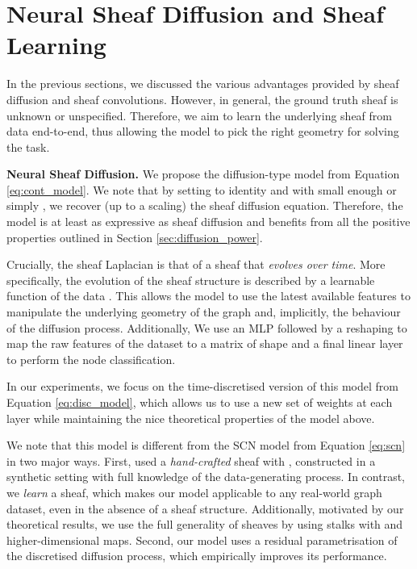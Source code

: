\documentclass{article}
\begin{document}
\section{Neural Sheaf Diffusion and Sheaf Learning}\label{sec:sheaf_learning}

In the previous sections, we discussed the various advantages provided by sheaf diffusion and sheaf convolutions. However, in general, the ground truth sheaf is unknown or unspecified. Therefore, we aim to learn the underlying sheaf from data end-to-end, thus allowing the model to pick the right geometry for solving the task. 

\textbf{Neural Sheaf Diffusion. } We propose the  diffusion-type model from Equation \ref{eq:cont_model}. We note that by setting  to identity and  with  small enough or simply , we recover (up to a scaling) the sheaf diffusion equation. Therefore, the model is at least as expressive as sheaf diffusion and benefits from all the positive properties outlined in Section \ref{sec:diffusion_power}. 

Crucially, the sheaf Laplacian  is that of a sheaf  that {\em evolves over time}. More specifically, the evolution of the sheaf structure is described by a learnable function of the data . This allows the model to use the latest available features to manipulate the underlying geometry of the graph and, implicitly, the behaviour of the diffusion process. Additionally, We use an MLP followed by a reshaping to map the raw features of the dataset to a matrix  of shape  and a final linear layer to perform the node classification. 

In our experiments, we focus on the time-discretised version of this model from Equation \ref{eq:disc_model}, which allows us to use a new set of weights at each layer  while maintaining the nice theoretical properties of the model above. 

We note that this model is different from the SCN model from Equation \ref{eq:scn} in two major ways. First, \citet{hansen2020sheaf} used a \emph{hand-crafted} sheaf with , constructed in a synthetic setting with full knowledge of the data-generating process. In contrast, we \emph{learn} a sheaf, which makes our model applicable to any real-world graph dataset, even in the absence of a sheaf structure. Additionally, motivated by our theoretical results, we use the full generality of sheaves by using stalks with  and higher-dimensional maps. Second, our model uses a residual parametrisation of the discretised diffusion process, which empirically improves its performance. 
\end{document}
